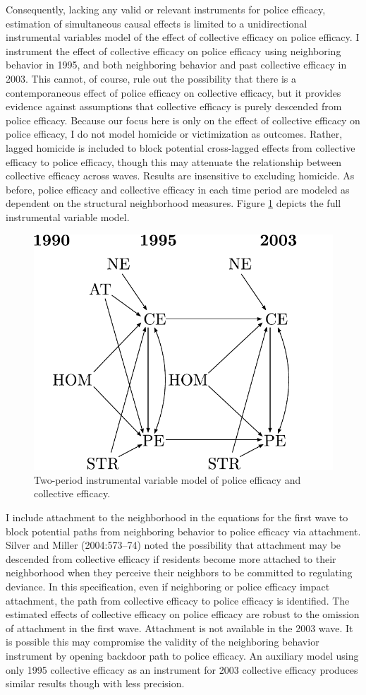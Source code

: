 \documentclass [11pt, proquest] {uwthesis}[2015/03/03]
\begin{document}
Consequently, lacking any valid or relevant instruments for police efficacy, estimation of simultaneous causal effects is limited to a unidirectional instrumental variables model of the effect of collective efficacy on police efficacy. I instrument the effect of collective efficacy on police efficacy using neighboring behavior in 1995, and both neighboring behavior and past collective efficacy in 2003. This cannot, of course, rule out the possibility that there is a contemporaneous effect of police efficacy on collective efficacy, but it provides evidence against assumptions that collective efficacy is purely descended from police efficacy. Because our focus here is only on the effect of collective efficacy on police efficacy, I do not model homicide or victimization as outcomes. Rather, lagged homicide is included to block potential cross-lagged effects from collective efficacy to police efficacy, though this may attenuate the relationship between collective efficacy across waves. Results are insensitive to excluding homicide. As before, police efficacy and collective efficacy in each time period are modeled as dependent on the structural neighborhood measures. Figure \ref{fig:ivmodel} depicts the full instrumental variable model.
\begin{figure}

{\centering \includegraphics[width=0.6\linewidth]{./figure/ch3/iv_model} 

}

\caption{Two-period instrumental variable model of police efficacy and collective efficacy.}\label{fig:ivmodel}
\end{figure}
I include attachment to the neighborhood in the equations for the first wave to block potential paths from neighboring behavior to police efficacy via attachment. Silver and Miller (2004:573--74) noted the possibility that attachment may be descended from collective efficacy if residents become more attached to their neighborhood when they perceive their neighbors to be committed to regulating deviance. In this specification, even if neighboring or police efficacy impact attachment, the path from collective efficacy to police efficacy is identified. The estimated effects of collective efficacy on police efficacy are robust to the omission of attachment in the first wave. Attachment is not available in the 2003 wave. It is possible this may compromise the validity of the neighboring behavior instrument by opening backdoor path to police efficacy. An auxiliary model using only 1995 collective efficacy as an instrument for 2003 collective efficacy produces similar results though with less precision.
\end{document}
